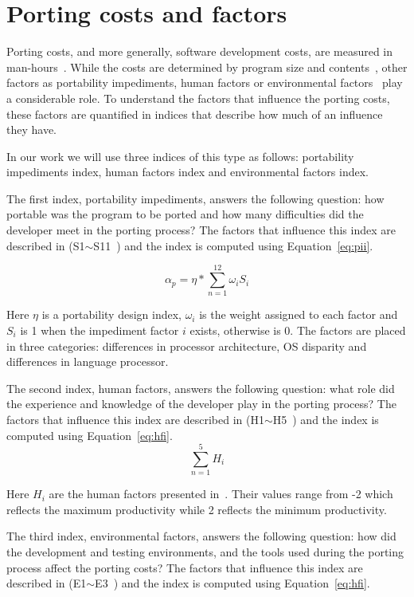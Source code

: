 \section{Porting costs and factors}

Porting costs, and more generally, software development costs, are measured in
man-hours~\cite{tanaka, hakuta}. While the costs are determined by program size
and contents~\cite{hakuta}, other factors as portability impediments, human
factors or environmental factors~\cite{hakuta} play a considerable role. To
understand the factors that influence the porting costs, these factors are
quantified in indices that describe how much of an influence they have.

In our work we will use three indices of this type as follows: portability
impediments index, human factors index and environmental factors index.

The first index, portability impediments, answers the following question: how
portable was the program to be ported and how many difficulties did the
developer meet in the porting process? The factors that influence this index are
described in (S1$\sim$S11~\cite{hakuta}) and the index is computed using
Equation~\ref{eq:pii}.


\begin{equation} \label{eq:pii}
\alpha_p = \eta * \sum_{n=1}^{12} \omega_i S_i
\end{equation}

Here $\eta$ is a portability design index, $\omega_i$ is the weight assigned to
each factor and $S_i$ is 1 when the impediment factor $i$ exists, otherwise is
0. The factors are placed in three categories: differences in processor
architecture, OS disparity and differences in language processor.

The second index, human factors, answers the following question: what role did
the experience and knowledge of the developer play in the porting process? The
factors that influence this index are described in (H1$\sim$H5~\cite{hakuta}) and
the index is computed using Equation~\ref{eq:hfi}.
\begin{equation} \label{eq:hfi}
\sum_{n=1}^{5} H_i
\end{equation}

Here $H_i$ are the human factors presented in~\cite{hakuta}. Their values range
from -2 which reflects the maximum productivity while 2 reflects the minimum
productivity.

The third index, environmental factors, answers the following question: how did
the development and testing environments, and the tools used during the porting
process affect the porting costs? The factors that influence this index are
described in (E1$\sim$E3~\cite{hakuta}) and the index is computed using
Equation~\ref{eq:hfi}.

